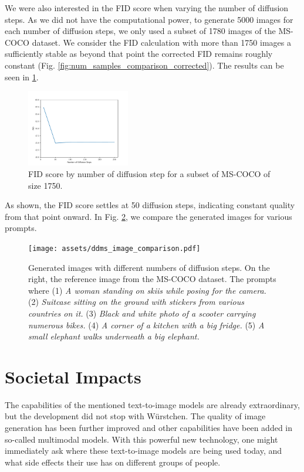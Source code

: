 \documentclass[11pt]{article}
\begin{document}
We were also interested in the FID score when varying the number of diffusion steps. As we did not have the computational power, to generate 5000 images for each number of diffusion steps, we only used a subset of 1780 images of the MS-COCO dataset. We consider the FID calculation with more than 1750 images a sufficiently stable as beyond that point the corrected FID remains roughly constant (Fig. \ref{fig:num_samples_comparison_corrected}). The results can be seen in \ref{fig:ddms_comparison}.
\begin{figure}[h]
    \centering
    \includegraphics[width=0.4\textwidth]{assets/ddms_comparison.pdf}
    \caption{FID score by number of diffusion step for a subset of MS-COCO of size 1750.}
    \label{fig:ddms_comparison}
\end{figure}

As shown, the FID score settles at 50 diffusion steps, indicating constant quality from that point onward. In Fig. \ref{fig:ddms_image_comparison}, we compare the generated images for various prompts.

\begin{figure}[h!]
    \centering
    \texttt{[image: assets/ddms\_image\_comparison.pdf]}
    \caption{Generated images with different numbers of diffusion steps. On the right, the reference image from the MS-COCO dataset. The prompts where (1) \textit{A woman standing on skiis while posing for the camera.} (2) \textit{Suitcase sitting on the ground with stickers from various countries on it.} (3) \textit{Black and white photo of a scooter carrying numerous bikes.} (4) \textit{A corner of a kitchen with a big fridge.} (5) \textit{A small elephant walks underneath a big elephant.}}
    \label{fig:ddms_image_comparison}
\end{figure}




\newpage

\section{Societal Impacts}
The capabilities of the mentioned text-to-image models are already extraordinary, but the development did not stop with Würstchen. The quality of image generation has been further improved\cite{lin2023designbenchexploringbenchmarkingdalle} and other capabilities have been added in so-called multimodal models\cite{yasunaga2022retrievalaugmentedmultimodellanguagemodeling}. With this powerful new technology, one might immediately ask where these text-to-image models are being used today, and what side effects their use has on different groups of people.
\end{document}
